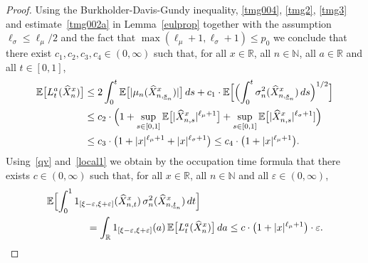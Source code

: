 \documentclass[11pt]{amsart}
\newcommand{\R}{{\mathbb R}}
\newcommand{\N}{{\mathbb N}}
\newcommand{\EE}{{\mathbb E}}
\newcommand{\eul}{{\widehat X}}
\newcommand{\usn}{\underline {s}_n}
\newcommand{\utn}{\underline {t}_n}
\newcommand{\eps}{\varepsilon}
\theoremstyle{plain}
\theoremstyle{definition}
\begin{document}
\begin{proof}
Using the Burkholder-Davis-Gundy inequality, \eqref{tmg004}, \eqref{tmg2}, \eqref{tmg3}  and estimate~\eqref{tmg002a} in Lemma~\ref{eulprop} together with the assumption $\ell_\sigma \le \ell_\mu/2$ and the
fact that  $\max(\ell_\mu+1,\ell_\sigma+1) \le p_0$  we conclude that there exist $c_1,c_2, c_3,c_4\in (0,\infty)$ such that,
  for all $x\in\R$, all $n\in\N$,
all $a\in\R$
   and all $t\in[0,1]$,
\begin{equation}\label{local1}
\begin{aligned}
\EE\bigl[L^a_t(\eul_n^x)\bigr] &  \le  2\int_0^t \EE\bigl[|\mu_n (\eul_{n,\usn}^x)|\bigr]\, ds + c_1\cdot \EE\Bigl[\Bigl(\int_0^t \sigma^2_n (\eul_{n,\usn}^x)\, ds\Bigr)^{1/2}\Bigr]\\
& \le c_2 \cdot\Bigl(1+ \sup_{s\in[0,1]}\EE\bigl[|\eul_{n,s}^x|^{\ell_\mu+1}\bigr]
 + \sup_{s\in[0,1]}\EE\bigl[|\eul_{n,s}^x|^{\ell_\sigma+1}]\Bigr)\\
&\le c_3 \cdot\bigl(1+ |x|^{\ell_\mu+1}+|x|^{\ell_\sigma+1}\bigr) \le c_4 \cdot \bigl(1+|x|^{\ell_\mu+1}\bigr).
\end{aligned}
\end{equation}
Using~\eqref{qv} and~\eqref{local1} we obtain by the occupation
time formula that there exists $c\in (0,\infty)$ such that,
for all $x\in\R$, all $n\in\N$ and all $\eps\in (0,\infty)$,
\begin{equation}\label{local2}
\begin{aligned}
&  \EE\Bigl[\int_0^1 1_{[\xi-\eps,\xi+\eps]}(\eul^x_{n,t})\, \sigma_n^2(\eul_{n,\utn}^x)\, dt\Bigr]
\\
&\qquad\qquad = \int_{\R}1_{[\xi-\eps,\xi+\eps]}(a)\, \EE\bigl[L^a_t(\eul_n^x)\bigr]\, da
 \le c\cdot \bigl(1+ |x|^{\ell_\mu+1}\bigr)\cdot \eps.
 \end{aligned}
\end{equation}



\end{proof}
\end{document}
